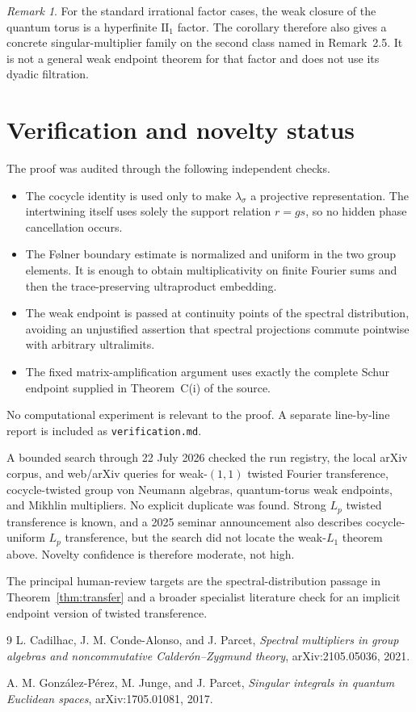 \documentclass[11pt]{article}
\theoremstyle{remark}
\newtheorem{remark}[theorem]{Remark}
\begin{document}
\begin{remark}
For the standard irrational factor cases, the weak closure of the quantum
torus is a hyperfinite $\mathrm{II}_1$ factor. The corollary therefore also
gives a concrete singular-multiplier family on the second class named in
Remark~2.5. It is not a general weak endpoint theorem for that factor and
does not use its dyadic filtration.
\end{remark}

\section{Verification and novelty status}

The proof was audited through the following independent checks.

\begin{itemize}
\item The cocycle identity is used only to make $\lambda_\sigma$ a
projective representation. The intertwining itself uses solely the support
relation $r=gs$, so no hidden phase cancellation occurs.
\item The F\o lner boundary estimate is normalized and uniform in the two
group elements. It is enough to obtain multiplicativity on finite Fourier
sums and then the trace-preserving ultraproduct embedding.
\item The weak endpoint is passed at continuity points of the spectral
distribution, avoiding an unjustified assertion that spectral projections
commute pointwise with arbitrary ultralimits.
\item The fixed matrix-amplification argument uses exactly the complete
Schur endpoint supplied in Theorem~C(i) of the source.
\end{itemize}

No computational experiment is relevant to the proof. A separate
line-by-line report is included as \texttt{verification.md}.

A bounded search through 22 July 2026 checked the run registry, the local
arXiv corpus, and web/arXiv queries for weak-$(1,1)$ twisted Fourier
transference, cocycle-twisted group von Neumann algebras, quantum-torus weak
endpoints, and Mikhlin multipliers. No explicit duplicate was found. Strong
$L_p$ twisted transference is known, and a 2025 seminar announcement also
describes cocycle-uniform $L_p$ transference, but the search did not locate
the weak-$L_1$ theorem above. Novelty confidence is therefore moderate, not
high.

The principal human-review targets are the spectral-distribution passage in
Theorem~\ref{thm:transfer} and a broader specialist literature check for an
implicit endpoint version of twisted transference.

\begin{thebibliography}{9}
L. Cadilhac, J. M. Conde-Alonso, and J. Parcet,
\emph{Spectral multipliers in group algebras and noncommutative
Calder\'on--Zygmund theory}, arXiv:2105.05036, 2021.

A. M. Gonz\'alez-P\'erez, M. Junge, and J. Parcet,
\emph{Singular integrals in quantum Euclidean spaces},
arXiv:1705.01081, 2017.
\end{thebibliography}
\end{document}
